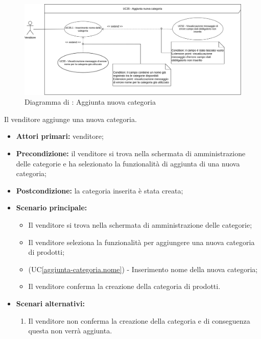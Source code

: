 \label{aggiunta-categoria}

\begin{figure}[H]
    \centering
    \includegraphics[width=\textwidth]{Immagini/DiagrammiUC/Venditore/AggiuntaCategoria.png}
    \caption{Diagramma di \actualUC: Aggiunta nuova categoria}
    \label{fig:aggiunta-categoria}
\end{figure}

Il venditore aggiunge una nuova categoria.
\begin{itemize}
    \item \textbf{Attori primari:} venditore;
    \item \textbf{Precondizione:} il venditore si trova nella schermata di amministrazione delle categorie e ha selezionato la funzionalità di aggiunta di una nuova categoria;
    \item \textbf{Postcondizione:} la categoria inserita è stata creata;
    \item \textbf{Scenario principale:}
    \begin{itemize}
    	\item Il venditore si trova nella schermata di amministrazione delle categorie;
    	\item Il venditore seleziona la funzionalità per aggiungere una nuova categoria di prodotti;
    	\item (UC\ref{aggiunta-categoria.nome}) - Inserimento nome della nuova categoria;
    	\item Il venditore conferma la creazione della categoria di prodotti.
    \end{itemize} 
    \item \textbf{Scenari alternativi:}
    \begin{enumerate}[label=\lett]
    	\item Il venditore non conferma la creazione della categoria e di conseguenza questa non verrà aggiunta.
    \end{enumerate}
\end{itemize}

